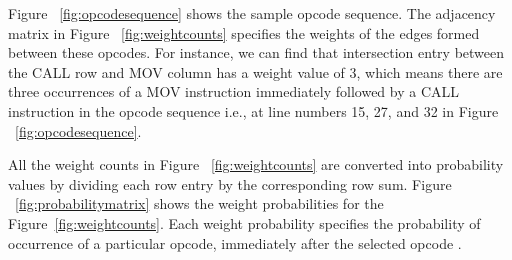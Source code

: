 Figure ~\ref{fig:opcodesequence} shows the sample opcode sequence. The adjacency matrix in Figure ~\ref{fig:weightcounts} specifies the weights of the edges formed between these opcodes. For instance, we can find that intersection entry between the CALL row and MOV column has a weight value of 3, which means there are three occurrences of a MOV instruction immediately followed by a CALL instruction in the opcode sequence i.e., at line numbers 15, 27, and 32 in Figure ~\ref{fig:opcodesequence}. 

All the weight counts in Figure ~\ref{fig:weightcounts} are converted into probability values by dividing each row entry by the corresponding row sum. Figure ~\ref{fig:probabilitymatrix} shows the weight probabilities for the Figure~\ref{fig:weightcounts}. Each weight probability specifies the probability of occurrence of a particular opcode, immediately after the selected opcode \cite{bib4}. 

